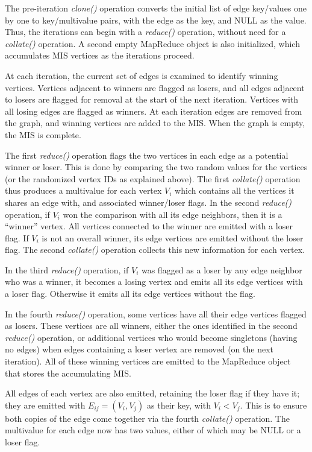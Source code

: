 The pre-iteration {\it clone()} operation converts the initial list of edge
key/values one by one to key/multivalue pairs, with the edge as the
key, and NULL as the value.  Thus, the iterations can begin with
a {\it reduce()} operation, without need for a {\it collate()} operation.  A
second empty MapReduce object is also initialized, which 
accumulates MIS vertices as the iterations proceed.

At each iteration, the current set of edges is examined to identify
winning vertices.  Vertices adjacent to winners are flagged as losers,
and all edges adjacent to losers are flagged for removal at the start
of the next iteration.  Vertices with all losing edges are flagged as
winners.  At each iteration edges are removed from the graph, and
winning vertices are added to the MIS.  When the graph is empty, the
MIS is complete.

The first {\it reduce()} operation flags the two vertices in each edge as a
potential winner or loser.  This is done by comparing the two random
values for the vertices (or the randomized vertex IDs as explained
above).  The first {\it collate()} operation thus produces a multivalue for
each vertex $V_i$ which contains all the vertices it shares an edge
with, and associated winner/loser flags.  In the second {\it reduce()}
operation, if $V_i$ won the comparison with all its edge neighbors,
then it is a ``winner'' vertex.  All vertices connected to the winner
are emitted with a loser flag.  If $V_i$ is not an overall winner, its
edge vertices are emitted without the loser flag.  The second
{\it collate()} operation collects this new information for each vertex.

In the third {\it reduce()} operation, if $V_i$ was flagged as a loser by
any edge neighbor who was a winner, it becomes a losing vertex
and emits all its edge vertices with a loser flag.  Otherwise it emits
all its edge vertices without the flag.

In the fourth {\it reduce()} operation, some vertices have all their
edge vertices flagged as losers.  These vertices are all winners,
either the ones identified in the second {\it reduce()} operation, or
additional vertices who would become singletons (having no edges) when
edges containing a loser vertex are removed (on the next iteration).
All of these winning vertices are emitted to the MapReduce object that
stores the accumulating MIS.

All edges of each vertex are also emitted, retaining the loser flag if
they have it;  they are emitted with $E_{ij} = (V_i, V_j)$ 
as their key, with $V_i < V_j$.  
This is to ensure both copies of the edge come together via the
fourth {\it collate()} operation.  The multivalue for each edge now
has two values, either of which may be NULL or a loser flag.

